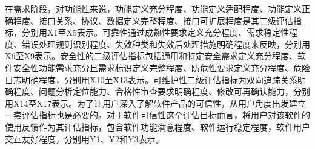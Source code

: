 在需求阶段，对功能性来说，功能定义充分程度、功能定义适配程度、功能定义正确程度、接口关系、协议、数据定义完整程度、接口可扩展程度是其二级评估指标，分别用X1至X5表示。可靠性通过成熟性要求定义充分程度、需求稳定性程度、错误处理规则识别程度、失效种类和失效后处理措施明确程度来反映，分别用X6至X9表示。\cite{郭婉琴2014一种机载软件安全性需求获取方法}安全性的二级评估指标包括通用和特定安全需求定义充分程度、软件安全性功能需求充分且需求标识定义完整程度、防危性要求定义充分程度、危险日志明确程度，分别用X10至X13表示。可维护性二级评估指标为双向追踪关系明确程度、问题分析定位能力、合格性审查要求明确程度、修改可再确认能力，分别用X14至X17表示。为了让用户深入了解软件产品的可信性，从用户角度出发建立一套评估指标也是必要的。对于软件可信性这个评估目标而言，将用户对该软件的使用反馈作为其评估指标，包含软件功能满意程度、软件运行稳定程度，软件用户交互友好程度，分别用Y1、Y2和Y3表示。

